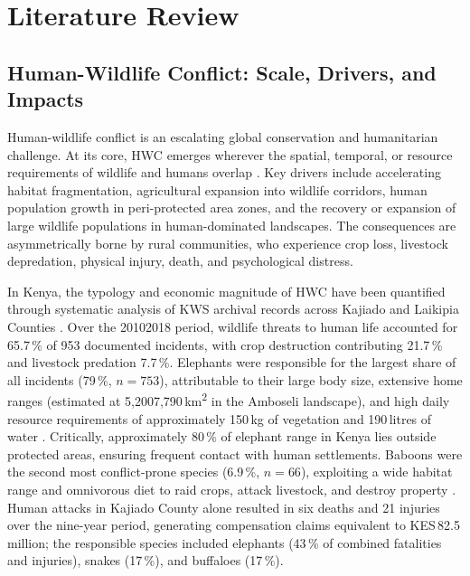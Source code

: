 \documentclass[12pt,a4paper]{article}
\begin{document}
    \section{Literature Review}

    \subsection{Human-Wildlife Conflict: Scale, Drivers, and Impacts}

    Human-wildlife conflict is an escalating global conservation and humanitarian challenge.
    At its core, HWC emerges wherever the spatial, temporal, or resource requirements of
    wildlife and humans overlap \cite{muliya2026}. Key drivers include accelerating habitat
    fragmentation, agricultural expansion into wildlife corridors, human population growth in
    peri-protected area zones, and the recovery or expansion of large wildlife populations in
    human-dominated landscapes. The consequences are asymmetrically borne by rural
    communities, who experience crop loss, livestock depredation, physical injury, death, and
    psychological distress.

    In Kenya, the typology and economic magnitude of HWC have been quantified through
    systematic analysis of KWS archival records across Kajiado and Laikipia Counties
    \cite{manoa2020}. Over the 20102018 period, wildlife threats to human life accounted for
    65.7\,\% of 953 documented incidents, with crop destruction contributing 21.7\,\% and
    livestock predation 7.7\,\%. Elephants were responsible for the largest share of all
    incidents (79\,\%, $n=753$), attributable to their large body size, extensive home ranges
    (estimated at 5,2007,790\,km\textsuperscript{2} in the Amboseli landscape), and high
    daily resource requirements of approximately 150\,kg of vegetation and 190\,litres of
    water \cite{manoa2020}. Critically, approximately 80\,\% of elephant range in Kenya lies
    outside protected areas, ensuring frequent contact with human settlements. Baboons were
    the second most conflict-prone species (6.9\,\%, $n=66$), exploiting a wide habitat range
    and omnivorous diet to raid crops, attack livestock, and destroy property \cite{manoa2020}.
    Human attacks in Kajiado County alone resulted in six deaths and 21 injuries over the
    nine-year period, generating compensation claims equivalent to KES\,82.5\,million; the
    responsible species included elephants (43\,\% of combined fatalities and injuries), snakes
    (17\,\%), and buffaloes (17\,\%).
\end{document}
